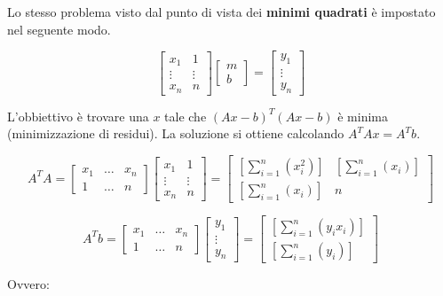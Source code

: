 \documentclass[\main/main.tex]{subfiles}
\begin{document}
Lo stesso problema visto dal punto di vista dei \textbf{minimi quadrati} è impostato nel seguente modo.

\[
	\begin{bmatrix}
		x_1    & 1      \\
		\vdots & \vdots \\
		x_n    & n
	\end{bmatrix}
	\begin{bmatrix}
		m \\
		b
	\end{bmatrix}
	=
	\begin{bmatrix}
		y_1    \\
		\vdots \\
		y_n
	\end{bmatrix}
\]

L'obbiettivo è trovare una $x$ tale che $(Ax-b)^T(Ax-b)$ è minima (minimizzazione di residui).
La soluzione si ottiene calcolando $A^TAx = A^Tb$.

\[
	A^TA = \begin{bmatrix}
		x_1 & \dots & x_n \\
		1   & \dots & n
	\end{bmatrix}
	\begin{bmatrix}
		x_1    & 1      \\
		\vdots & \vdots \\
		x_n    & n
	\end{bmatrix}
	=
	\begin{bmatrix}
		\left [ \sum_{i=1}^n \left(x_i^2 \right) \right ] & \left [ \sum_{i=1}^n \left(x_i \right) \right ] \\
		\left [ \sum_{i=1}^n \left(x_i \right) \right ]   & n
	\end{bmatrix}
\]

\[
	A^Tb = \begin{bmatrix}
		x_1 & \dots & x_n \\
		1   & \dots & n
	\end{bmatrix}
	\begin{bmatrix}
		y_1    \\
		\vdots \\
		y_n
	\end{bmatrix}
	=
	\begin{bmatrix}
		\left [ \sum_{i=1}^n \left(y_i x_i \right) \right ] \\
		\left [ \sum_{i=1}^n \left(y_i \right) \right ]
	\end{bmatrix}
\]

Ovvero:
\end{document}
